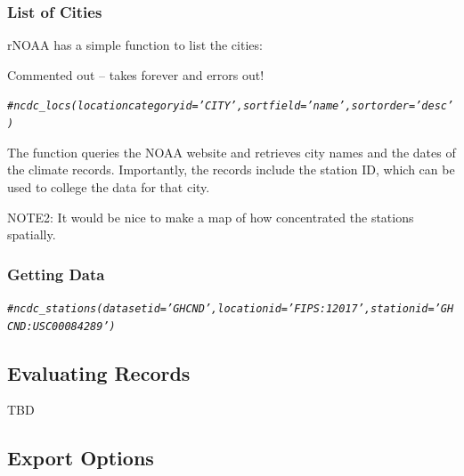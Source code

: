 \documentclass{article}\usepackage[]{graphicx}\usepackage[]{color}
\makeatletter
\newcommand{\hlcom}[1]{\textcolor[rgb]{0.678,0.584,0.686}{\textit{#1}}}%
\newenvironment{kframe}{%
 \def\at@end@of@kframe{}%
 \ifinner\ifhmode%
  \def\at@end@of@kframe{\end{minipage}}%
  \begin{minipage}{\columnwidth}%
 \fi\fi%
 \def\FrameCommand##1{\hskip\@totalleftmargin \hskip-\fboxsep
 \colorbox{shadecolor}{##1}\hskip-\fboxsep
     \hskip-\linewidth \hskip-\@totalleftmargin \hskip\columnwidth}%
 \MakeFramed {\advance\hsize-\width
   \@totalleftmargin\z@ \linewidth\hsize
   \@setminipage}}%
 {\par\unskip\endMakeFramed%
 \at@end@of@kframe}
\newenvironment{knitrout}{}{} %
\makeatother
\begin{document}
\subsubsection{List of Cities}

rNOAA has a simple function to list the cities:

Commented out -- takes forever and errors out!
\begin{knitrout}
\color{fgcolor}\begin{kframe}
\begin{alltt}
\hlcom{#ncdc_locs(locationcategoryid='CITY', sortfield='name', sortorder='desc')}
\end{alltt}
\end{kframe}
\end{knitrout}

The function queries the NOAA website and retrieves city names and the dates of the climate records. Importantly, the records include the station ID, which can be used to college the data for that city. 


NOTE2: It would be nice to make a map of how concentrated the stations spatially. 

\subsubsection{Getting Data}

\begin{knitrout}
\color{fgcolor}\begin{kframe}
\begin{alltt}
\hlcom{#ncdc_stations(datasetid='GHCND', locationid='FIPS:12017', stationid='GHCND:USC00084289')}
\end{alltt}
\end{kframe}
\end{knitrout}

\subsection{Evaluating Records}

TBD

\subsection{Export Options}
\end{document}
